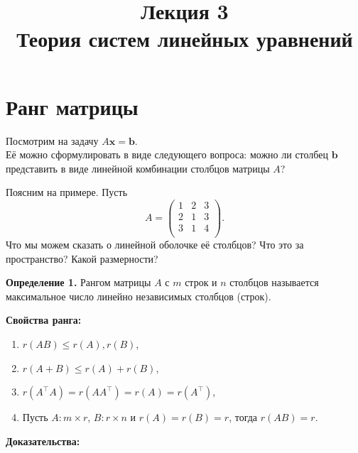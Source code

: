 \documentclass[11pt,a4paper]{article}
\title{Лекция 3 \\
    Теория систем линейных уравнений
    }
\providecommand{\tightlist}{%
      \setlength{\itemsep}{0pt}\setlength{\parskip}{0pt}}
\begin{document}
    
    \maketitle
    
    
    \hypertarget{ux440ux430ux43dux433-ux43cux430ux442ux440ux438ux446ux44b}{%
\section{Ранг
матрицы}\label{ux440ux430ux43dux433-ux43cux430ux442ux440ux438ux446ux44b}}

Посмотрим на задачу \(A \mathbf{x} = \mathbf{b}\).\\
Её можно сформулировать в виде следующего вопроса: можно ли столбец
\(\mathbf{b}\) представить в виде линейной комбинации столбцов матрицы
\(A\)?

Поясним на примере. Пусть \[
  A = 
  \begin{pmatrix}
     1 & 2 & 3 \\
     2 & 1 & 3 \\
     3 & 1 & 4 \\
  \end{pmatrix}.
\] Что мы можем сказать о линейной оболочке её столбцов? Что это за
пространство? Какой размерности?

    \textbf{Определение 1.} Рангом матрицы \(A\) с \(m\) строк и \(n\)
столбцов называется максимальное число линейно независимых столбцов
(строк).

    \textbf{Свойства ранга:}

\begin{enumerate}
\def\labelenumi{\arabic{enumi}.}
\tightlist
\item
  \(r(AB) \le r(A), r(B)\),
\item
  \(r(A+B) \le r(A) + r(B)\),
\item
  \(r(A^\top A) = r(AA^\top) = r(A) = r(A^\top)\),
\item
  Пусть \(A: m \times r\), \(B: r \times n\) и \(r(A) = r(B) = r\),
  тогда \(r(AB) = r\).
\end{enumerate}

\textbf{Доказательства:}
\end{document}
